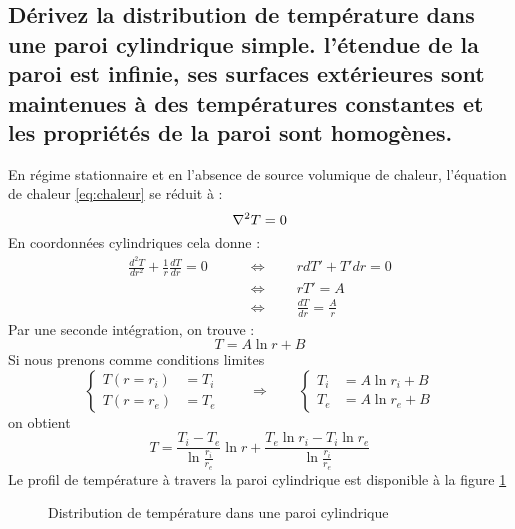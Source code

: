 \subsection{Dérivez la distribution de température dans une paroi cylindrique simple. l'étendue de la paroi est infinie, ses surfaces extérieures sont maintenues à des températures constantes et les propriétés de la paroi sont homogènes.}
En régime stationnaire et en l'absence de source volumique de chaleur, l'équation de chaleur \ref{eq:chaleur} se réduit à :
\begin{equation} \nabla ^2T = 0 \end{equation}
En coordonnées cylindriques cela donne :
\begin{align} \frac{d^2T}{dr^2} + \frac{1}{r}\frac{dT}{dr} = 0 \qquad&\Leftrightarrow\qquad rdT' + T'dr = 0 \\ &\Leftrightarrow\qquad rT' = A \\ &\Leftrightarrow\qquad \frac{dT}{dr} = \frac{A}{r} \end{align}
Par une seconde intégration, on trouve :
\begin{equation} T = A\ln{r} + B \end{equation}
Si nous prenons comme conditions limites
\begin{equation} \begin{cases} T(r=r_i) &= T_i \\ T(r=r_e) &= T_e \end{cases} \qquad \Rightarrow \qquad \begin{cases} T_i &= A\ln{r_i} + B \\ T_e &= A\ln{r_e} + B \end{cases} \end{equation}
on obtient 
\begin{equation} T = \frac{T_i - T_e}{\ln\frac{r_i}{r_e}}\ln{r} + \frac{T_e\ln{r_i} - T_i\ln{r_e}}{\ln\frac{r_i}{r_e}} \label{eq:paroi_cylindrique}\end{equation}
Le profil de température à travers la paroi cylindrique est disponible à la figure \ref{fig:q3_5}
\begin{figure}[p]\centering
    \caption{Distribution de température dans une paroi cylindrique}
    \label{fig:q3_5}
\end{figure}

